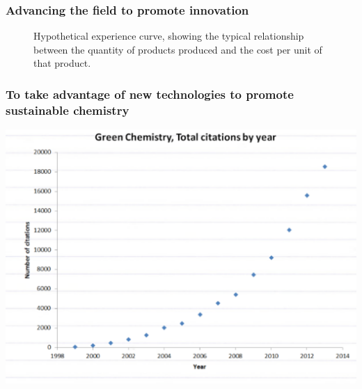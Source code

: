 \documentclass[10pt, compress]{beamer}
\begin{document}
\begin{frame}[fragile]
\subsubsection{Advancing the field to promote innovation}
\begin{center}
\begin{figure}[h !]
\caption{\centering Hypothetical experience curve, showing the typical relationship between the quantity of products produced and the cost per unit of that product.}
\end{figure}
\end{center}
\end{frame}
\subsubsection{To take advantage of new technologies to promote sustainable chemistry}
\begin{frame}[fragile]
\begin{center}
\includegraphics[width=\textwidth]{greenchem.PNG}
\end{center}
\end{frame}
\end{document}
